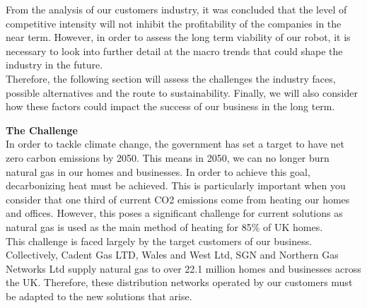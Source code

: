 \documentclass[11pt]{article}		%
\begin{document}
    		From the analysis of our customers industry, it was concluded that the level of competitive intensity will not inhibit the profitability of the companies in the near term. However, in order to assess the long term viability of our robot, it is necessary to look into further detail at the macro trends that could shape the industry in the future.\\
    	    \hspace*{3ex}Therefore, the following section will assess the challenges the industry faces, possible alternatives and the route to sustainability. Finally, we will also consider how these factors could impact the success of our business in the long term. 
    	    
    	    \textbf{The Challenge}\\
            In order to tackle climate change, the government has set a target to have net zero carbon emissions by 2050. This means in 2050, we can no longer burn natural gas in our homes and businesses. In order to achieve this goal, decarbonizing heat must be achieved. This is particularly important when you consider that one third of current CO2 emissions come from heating our homes and offices. However, this poses a significant challenge for current solutions as natural gas is used as the main method of heating for 85\% of UK homes.\\
            \hspace*{3ex}This challenge is faced largely by the target customers of our business. Collectively, Cadent Gas LTD, Wales and West Ltd, SGN and Northern Gas Networks Ltd supply natural gas to over 22.1 million homes and businesses across the UK. Therefore, these distribution networks operated by our customers must be adapted to the new solutions that arise. 
    
\end{document}

